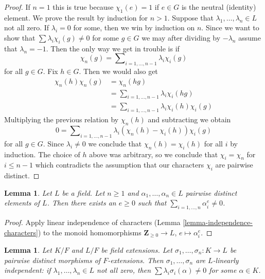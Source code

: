 \documentclass{stacks-project}
\theoremstyle{plain}
\newtheorem{lemma}[subsection]{Lemma}
\theoremstyle{definition}
\theoremstyle{remark}
\numberwithin{equation}{subsection}
\begin{document}
\begin{proof}
If $n = 1$ this is true because $\chi_1(e) = 1$ if $e \in G$ is the
neutral (identity) element. We prove the result by induction for $n > 1$.
Suppose that $\lambda_1, \ldots, \lambda_n \in L$ not all zero.
If $\lambda_i = 0$ for some, then we win by induction on $n$.
Since we want to show that $\sum \lambda_i\chi_i(g) \not = 0$
for some $g \in G$ we may after dividing by $-\lambda_n$
assume that $\lambda_n = -1$. Then the only way we get in trouble
is if
$$
\chi_n(g) = \sum\nolimits_{i = 1, \ldots, n - 1} \lambda_i\chi_i(g)
$$
for all $g \in G$. Fix $h \in G$. Then we would also get
\begin{align*}
\chi_n(h)\chi_n(g) & = \chi_n(hg) \\
& = \sum\nolimits_{i = 1, \ldots, n - 1} \lambda_i\chi_i(hg) \\
& = \sum\nolimits_{i = 1, \ldots, n - 1} \lambda_i\chi_i(h) \chi_i(g)
\end{align*}
Multiplying the previous relation by $\chi_n(h)$ and subtracting we obtain
$$
0 = \sum\nolimits_{i = 1, \ldots, n - 1}
\lambda_i (\chi_n(h) - \chi_i(h)) \chi_i(g)
$$
for all $g \in G$. Since $\lambda_i \not = 0$ we conclude that
$\chi_n(h) = \chi_i(h)$ for all $i$ by induction.
The choice of $h$ above was arbitrary, so we conclude
that $\chi_i = \chi_n$ for $i \leq n - 1$ which contradicts
the assumption that our characters $\chi_i$ are pairwise distinct.
\end{proof}

\begin{lemma}
\label{lemma-sums-of-powers}
Let $L$ be a field. Let $n \geq 1$ and $\alpha_1, \ldots, \alpha_n \in L$
pairwise distinct elements of $L$. Then there exists an
$e \geq 0$ such that $\sum_{i = 1, \ldots, n} \alpha_i^e \not = 0$.
\end{lemma}

\begin{proof}
Apply linear independence of characters
(Lemma \ref{lemma-independence-characters})
to the monoid homomorphisms $\mathbf{Z}_{\geq 0} \to L$,
$e \mapsto \alpha_i^e$.
\end{proof}

\begin{lemma}
\label{lemma-independence-embeddings}
Let $K/F$ and $L/F$ be field extensions. Let
$\sigma_1, \ldots, \sigma_n : K \to L$ be pairwise distinct
morphisms of $F$-extensions. Then $\sigma_1, \ldots, \sigma_n$
are $L$-linearly independent: if $\lambda_1, \ldots, \lambda_n \in L$
not all zero, then $\sum \lambda_i\sigma_i(\alpha) \not = 0$
for some $\alpha \in K$.
\end{lemma}
\end{document}
